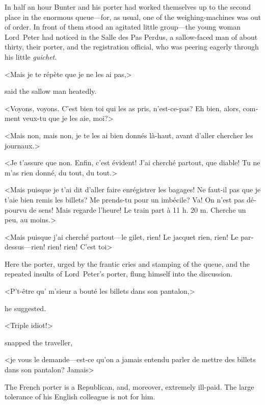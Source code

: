 In half an hour Bunter and his porter had worked themselves up to the second place in the enormous queue—for, as usual, one of the weighing-machines was out of order. In front of them stood an agitated little group—the young woman Lord~Peter had noticed in the Salle des Pas Perdus, a sallow-faced man of about thirty, their porter, and the registration official, who was peering eagerly through his little \textit{guichet}.

\begin{french}<Mais je te répète que je ne les ai pas,> \end{french} said the sallow man heatedly. \begin{french}<Voyons, voyons. C'est bien toi qui les as pris, n'est-ce-pas? Eh bien, alors, comment veux-tu que je les aie, moi?>

<Mais non, mais non, je te les ai bien donnés là-haut, avant d'aller chercher les journaux.>

<Je t'assure que non. Enfin, c'est évident! J'ai cherché partout, que diable! Tu ne m'as rien donné, du tout, du tout.>

<Mais puisque je t'ai dit d'aller faire enrégistrer les bagages! Ne faut-il pas que je t'aie bien remis les billets? Me prends-tu pour un imbécile? Va! On n'est pas dépourvu de sens! Mais regarde l'heure! Le train part à 11 h. 20 m. Cherche un peu, au moins.>

<Mais puisque j'ai cherché partout—le gilet, rien! Le jacquet rien, rien! Le pardessus—rien! rien! rien! C'est toi\longdash>
\end{french}

Here the porter, urged by the frantic cries and stamping of the queue, and the repeated insults of Lord~Peter's porter, flung himself into the discussion.
\begin{french}<P't-être qu' m'sieur a bouté les billets dans son pantalon,>\end{french} he suggested.

\begin{french}<Triple idiot!>\end{french} snapped the traveller, \begin{french}<je vous le demande—est-ce qu'on a jamais entendu parler de mettre des billets dans son pantalon? Jamais\longdash>\end{french}

The French porter is a Republican, and, moreover, extremely ill-paid. The large tolerance of his English colleague is not for him.


